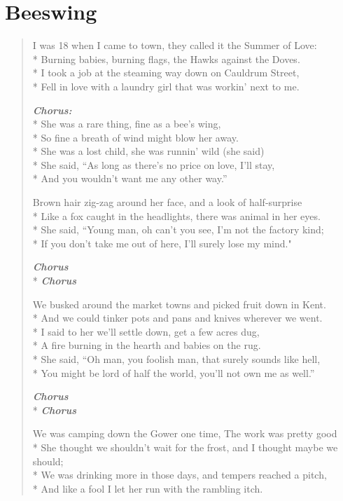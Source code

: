 \documentclass[9pt,twoside]{extarticle}
\makeatletter
\newenvironment{xverse}{
	\begin{verse}
	\fontsize{8.5}{10.5}\selectfont
}{
	\end{verse}
}
\newcommand{\chorusdef}{\textbf{\emph{Chorus:}}\\*}
\newcommand{\chorus@mark}[1][1]{%
\textbf{\emph{Chorus \ifthenelse{\equal{#1}{1}}{}{$\times$ #1}}}%
}
\newcommand{\chorusmark}[1][1]{%
\ifvmode%
\vspace{-0.5\stanzaskip}%
\chorus@mark[#1]%
\vspace{-0.5\stanzaskip}%
\else \\*%
\chorus@mark[#1]%
\fi%
}
\makeatother
\begin{document}
\section{Beeswing}
\begin{xverse}
I was 18 when I came to town, they called it the Summer of Love: \\*
Burning babies, burning flags, the Hawks against the Doves. \\*
I took a job at the steaming way down on Cauldrum Street, \\*
Fell in love with a laundry girl that was workin’ next to me.

\chorusdef
She was a rare thing, fine as a bee’s wing, \\*
So fine a breath of wind might blow her away. \\*
She was a lost child, she was runnin’ wild (she said) \\*
She said, “As long as there’s no price on love, I’ll stay, \\*
And you wouldn’t want me any other way.”

Brown hair zig-zag around her face, and a look of half-surprise \\*
Like a fox caught in the headlights, there was animal in her eyes. \\*
She said, “Young man, oh can’t you see, I’m not the factory kind; \\*
If you don’t take me out of here, I’ll surely lose my mind."

\chorusmark

We busked around the market towns and picked fruit down in Kent. \\*
And we could tinker pots and pans and knives wherever we went. \\*
I said to her we’ll settle down, get a few acres dug, \\*
A fire burning in the hearth and babies on the rug. \\*
She said, “Oh man, you foolish man, that surely sounds like hell, \\*
You might be lord of half the world, you’ll not own me as well.”

\chorusmark

We was camping down the Gower one time, The work was pretty good \\*
She thought we shouldn’t wait for the frost, and I thought maybe we should; \\*
We was drinking more in those days, and tempers reached a pitch, \\*
And like a fool I let her run with the rambling itch.


\end{xverse}
\end{document}
